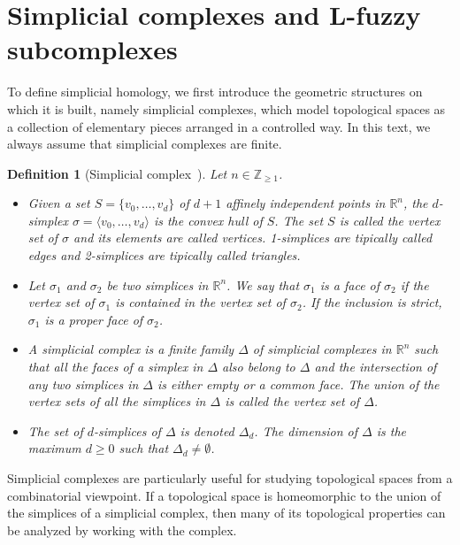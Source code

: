 \documentclass[a4paper,10pt]{article}
\newtheorem{definition}[theorem]{Definition}
\newcommand{\bbr}{\mathbb{R}}
\newcommand{\bbz}{\mathbb{Z}}
\begin{document}
\section{Simplicial complexes and L-fuzzy subcomplexes}
\label{sec:lfuzzysubcomplexes}

To define simplicial homology, we first introduce the geometric structures on which it is built, namely simplicial complexes, which model topological spaces as a collection of elementary pieces arranged in a controlled way. In this text, we always assume that simplicial complexes are finite.

\begin{definition}[Simplicial complex~\cite{croom2012basic}]
\label{def:simplicial_complex}
Let \(n\in \bbz_{\geq1}\).
\begin{itemize}
\item Given a set \(S=\{v_0,\dots,v_d\}\) of \(d+1\) affinely independent points in \(\bbr^n\), the \emph{\(d\)-simplex} \(\sigma = \langle v_0,\dots,v_d\rangle\) is the convex hull of \(S\). 
The set \(S\) is called the \emph{vertex set of \(\sigma\)} and its elements are called \emph{vertices}. 1-simplices are tipically called \emph{edges} and 2-simplices are tipically called \emph{triangles}.
\item Let \(\sigma_1\) and \(\sigma_2\) be two simplices in \(\bbr^n\). 
We say that \(\sigma_1\) is a \emph{face of} \(\sigma_2\) if the vertex set of \(\sigma_1\) is contained in the vertex set of \(\sigma_2\). If the inclusion is strict, \(\sigma_1\) is a \emph{proper face of} \(\sigma_2\).
\item A \emph{simplicial complex} is a finite family \(\Delta\) of simplicial complexes in \(\bbr^n\) such that all the faces of a simplex in \(\Delta\) also belong to \(\Delta\) and the intersection of any two simplices in \(\Delta\) is either empty or a common face. The union of the vertex sets of all the simplices in \(\Delta\) is called the \emph{vertex set of \(\Delta\)}.
\item The set of \(d\)-simplices of \(\Delta\) is denoted \(\Delta_d\). The \emph{dimension} of \(\Delta\) is the maximum \(d \geq 0\) such that \(\Delta_d \neq \emptyset\).
\end{itemize}
\end{definition}

Simplicial complexes are particularly useful for studying topological spaces from a combinatorial viewpoint. 
If a topological space is homeomorphic to the union of the simplices of a simplicial complex, then many of its topological properties can be analyzed by working with the complex.
\end{document}
